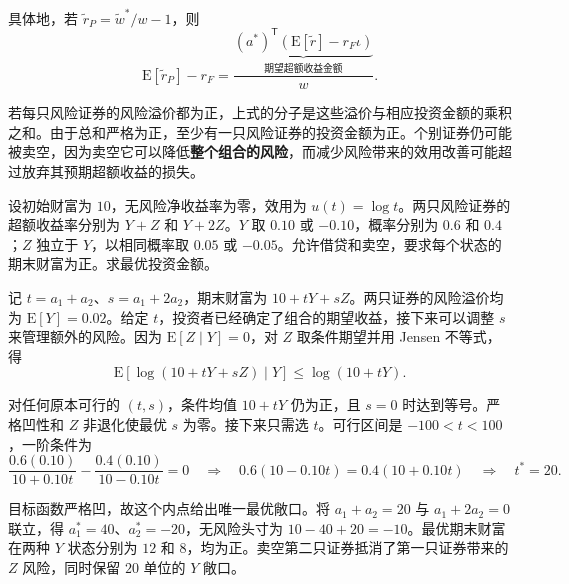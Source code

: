 具体地，若 $\tilde r_P=\tilde w^*/w-1$，则
\[
 \mathrm E[\tilde r_P]-r_F=
 \frac{\underbrace{(a^*)^{\mathsf T}(\mathrm E[\tilde r]-r_F\iota)}_{\text{期望超额收益金额}}}{w}.
\]

\begin{tcolorbox}[knowledge,title=多证券组合中的对冲]
若每只风险证券的风险溢价都为正，上式的分子是这些溢价与相应投资金额的乘积之和。由于总和严格为正，至少有一只风险证券的投资金额为正。个别证券仍可能被卖空，因为卖空它可以降低\textbf{整个组合的风险}，而减少风险带来的效用改善可能超过放弃其预期超额收益的损失。
\end{tcolorbox}

\begin{tcolorbox}[example,title=两只正溢价证券的最优多空组合]
\begin{question}
设初始财富为 $10$，无风险净收益率为零，效用为 $u(t)=\log t$。两只风险证券的超额收益率分别为 $Y+Z$ 和 $Y+2Z$。$Y$ 取 $0.10$ 或 $-0.10$，概率分别为 $0.6$ 和 $0.4$；$Z$ 独立于 $Y$，以相同概率取 $0.05$ 或 $-0.05$。允许借贷和卖空，要求每个状态的期末财富为正。求最优投资金额。
\end{question}
\begin{solution}[blank-type=manual,blank-vsep=8\baselineskip]
记 $t=a_1+a_2$、$s=a_1+2a_2$，期末财富为 $10+tY+sZ$。两只证券的风险溢价均为 $\mathrm E[Y]=0.02$。给定 $t$，投资者已经确定了组合的期望收益，接下来可以调整 $s$ 来管理额外的风险。因为 $\mathrm E[Z\mid Y]=0$，对 $Z$ 取条件期望并用 Jensen 不等式，得
\[
 \mathrm E[\log(10+tY+sZ)\mid Y]\le\log(10+tY).
\]

对任何原本可行的 $(t,s)$，条件均值 $10+tY$ 仍为正，且 $s=0$ 时达到等号。严格凹性和 $Z$ 非退化使最优 $s$ 为零。接下来只需选 $t$。可行区间是 $-100<t<100$，一阶条件为
\[
 \frac{0.6(0.10)}{10+0.10t}-\frac{0.4(0.10)}{10-0.10t}=0
 \quad\Longrightarrow\quad
 0.6(10-0.10t)=0.4(10+0.10t)
 \quad\Longrightarrow\quad t^*=20.
\]

目标函数严格凹，故这个内点给出唯一最优敞口。将 $a_1+a_2=20$ 与 $a_1+2a_2=0$ 联立，得 $a_1^*=40$、$a_2^*=-20$，无风险头寸为 $10-40+20=-10$。最优期末财富在两种 $Y$ 状态分别为 $12$ 和 $8$，均为正。卖空第二只证券抵消了第一只证券带来的 $Z$ 风险，同时保留 $20$ 单位的 $Y$ 敞口。
\end{solution}
\end{tcolorbox}

